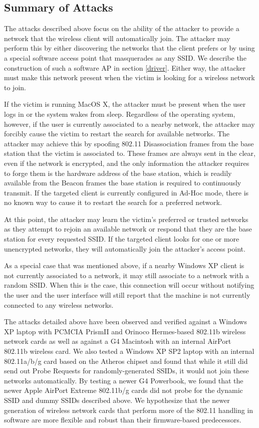 \documentclass[10pt,twocolumn]{article}
\begin{document}
\subsection{Summary of Attacks}
\label{attacksummary}

The attacks described above focus on the ability of the attacker to
provide a network that the wireless client will automatically join.
The attacker may perform this by either discovering the networks that
the client prefers or by using a special software access point that
masquerades as any SSID.  We describe the construction of such a
software AP in section \ref{driver}.  Either way, the attacker must
make this network present when the victim is looking for a wireless
network to join.

If the victim is running MacOS X, the attacker must be present when
the user logs in or the system wakes from sleep.  Regardless of the
operating system, however, if the user is currently associated to a
nearby network, the attacker may forcibly cause the victim to restart
the search for available networks.  The attacker may achieve this by
spoofing 802.11 Disassociation frames from the base station that the
victim is associated to.  These frames are always sent in the clear,
even if the network is encrypted, and the only information the
attacker requires to forge them is the hardware address of the base
station, which is readily available from the Beacon frames the base
station is required to continuously transmit.  If the targeted client
is currently configured in Ad-Hoc mode, there is no known way to cause
it to restart the search for a preferred network.

At this point, the attacker may learn the victim's preferred or
trusted networks as they attempt to rejoin an available network or
respond that they are the base station for every requested SSID.  If
the targeted client looks for one or more unencrypted networks, they
will automatically join the attacker's access point.

As a special case that was mentioned above, if a nearby Windows XP
client is not currently associated to a network, it may still
associate to a network with a random SSID.  When this is the case,
this connection will occur without notifying the user and the user
interface will still report that the machine is not currently
connected to any wireless networks.

The attacks detailed above have been observed and verified against a
Windows XP laptop with PCMCIA PrismII and Orinoco Hermes-based 802.11b
wireless network cards as well as against a G4 Macintosh with an
internal AirPort 802.11b wireless card.  We also tested a Windows XP
SP2 laptop with an internal 802.11a/b/g card based on the Atheros
chipset and found that while it still did send out Probe Requests for
randomly-generated SSIDs, it would not join these networks
automatically.  By testing a newer G4 Powerbook, we found that the
newer Apple AirPort Extreme 802.11b/g cards did not probe for the
dynamic SSID and dummy SSIDs described above.  We hypothesize that the
newer generation of wireless network cards that perform more of the
802.11 handling in software are more flexible and robust than their
firmware-based predecessors.
\end{document}
